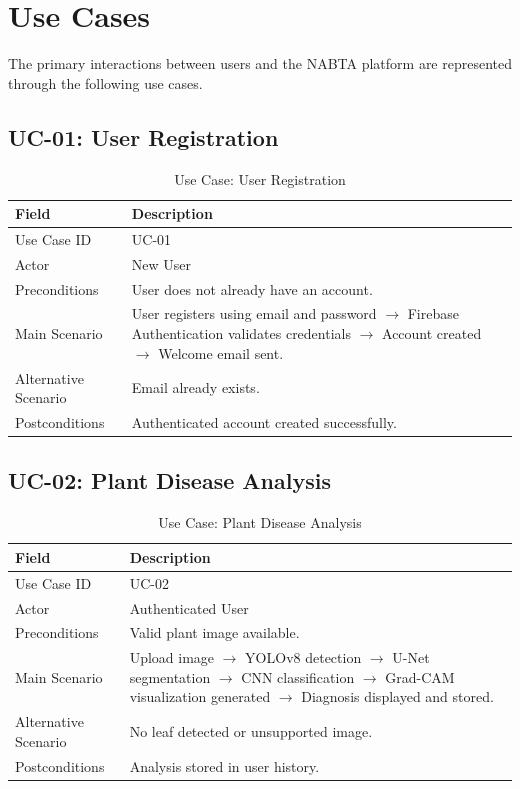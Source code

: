 \section{Use Cases}
\label{sec:use_cases}

The primary interactions between users and the NABTA platform are represented through the following use cases.

\subsection{UC-01: User Registration}

\begin{table}[H]
\centering
\caption{Use Case: User Registration}
\renewcommand{\arraystretch}{1.4}
\begin{tabularx}{\textwidth}{l X}
\toprule
\textbf{Field} & \textbf{Description}\\
\midrule
Use Case ID & UC-01\\
Actor & New User\\
Preconditions & User does not already have an account.\\
Main Scenario &
User registers using email and password $\rightarrow$
Firebase Authentication validates credentials $\rightarrow$
Account created $\rightarrow$
Welcome email sent.\\
Alternative Scenario &
Email already exists.\\
Postconditions &
Authenticated account created successfully.\\
\bottomrule
\end{tabularx}
\end{table}

\subsection{UC-02: Plant Disease Analysis}

\begin{table}[H]
\centering
\caption{Use Case: Plant Disease Analysis}
\renewcommand{\arraystretch}{1.4}
\begin{tabularx}{\textwidth}{l X}
\toprule
\textbf{Field} & \textbf{Description}\\
\midrule
Use Case ID & UC-02\\
Actor & Authenticated User\\
Preconditions & Valid plant image available.\\
Main Scenario &
Upload image $\rightarrow$
YOLOv8 detection $\rightarrow$
U-Net segmentation $\rightarrow$
CNN classification $\rightarrow$
Grad-CAM visualization generated $\rightarrow$
Diagnosis displayed and stored.\\
Alternative Scenario &
No leaf detected or unsupported image.\\
Postconditions &
Analysis stored in user history.\\
\bottomrule
\end{tabularx}
\end{table}

